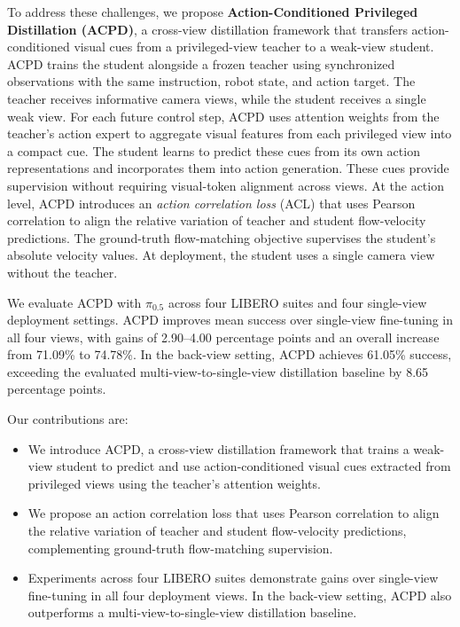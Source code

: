 \documentclass{ELSP}
\begin{document}
To address these challenges, we propose \textbf{Action-Conditioned Privileged Distillation (ACPD)}, a cross-view distillation framework that transfers action-conditioned visual cues from a privileged-view teacher to a weak-view student.
ACPD trains the student alongside a frozen teacher using synchronized observations with the same instruction, robot state, and action target. The teacher receives informative camera views, while the student receives a single weak view. For each future control step, ACPD uses attention weights from the teacher's action expert to aggregate visual features from each privileged view into a compact cue. The student learns to predict these cues from its own action representations and incorporates them into action generation. These cues provide supervision without requiring visual-token alignment across views.
At the action level, ACPD introduces an \textit{action correlation loss} (ACL) that uses Pearson correlation to align the relative variation of teacher and student flow-velocity predictions. The ground-truth flow-matching objective supervises the student's absolute velocity values. At deployment, the student uses a single camera view without the teacher.

We evaluate ACPD with $\pi_{0.5}$ across four LIBERO suites and four single-view deployment settings. ACPD improves mean success over single-view fine-tuning in all four views, with gains of 2.90--4.00 percentage points and an overall increase from 71.09\% to 74.78\%. In the back-view setting, ACPD achieves 61.05\% success, exceeding the evaluated multi-view-to-single-view distillation baseline by 8.65 percentage points.


Our contributions are:
\begin{itemize}
    \item We introduce ACPD, a cross-view distillation framework that trains a weak-view student to predict and use action-conditioned visual cues extracted from privileged views using the teacher's attention weights.
    \item We propose an action correlation loss that uses Pearson correlation to align the relative variation of teacher and student flow-velocity predictions, complementing ground-truth flow-matching supervision.
    \item Experiments across four LIBERO suites demonstrate gains over single-view fine-tuning in all four deployment views. In the back-view setting, ACPD also outperforms a multi-view-to-single-view distillation baseline.
\end{itemize}
\end{document}
